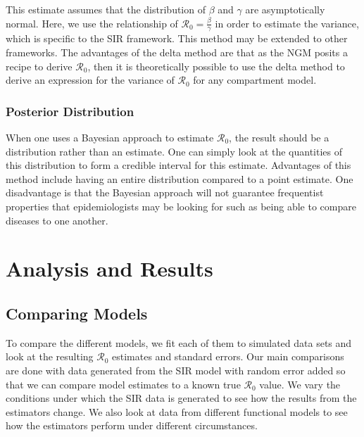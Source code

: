 \documentclass[12pt]{article}
\newcommand{\rr}{\ensuremath{\mathcal{R}_0}}
\begin{document}
This estimate assumes that the distribution of $\beta$ and $\gamma$ are asymptotically normal.  Here, we use the relationship of $\rr = \frac{\beta}{\gamma}$ in order to estimate the variance, which is specific to the SIR framework.  This method may be extended to other frameworks.  The advantages of the delta method are that as the NGM posits a recipe to derive $\rr$, then it is theoretically possible to use the delta method to derive an expression for the variance of $\rr$ for any compartment model.


\subsubsection{Posterior Distribution}
When one uses a Bayesian approach to estimate $\rr$, the result should be a distribution rather than an estimate.  One can simply look at the quantities of this distribution to form a credible interval for this estimate.  Advantages of this method include having an entire distribution compared to a point estimate.  One disadvantage is that the Bayesian approach will not guarantee frequentist properties that epidemiologists may be looking for such as being able to compare diseases to one another.







\section{Analysis and Results}
\label{sec:results}

\subsection{Comparing Models}

To compare the different models, we fit each of them to simulated data sets and look at the resulting $\rr$ estimates and standard errors. Our main comparisons are done with data generated from the SIR model with random error added so that we can compare model estimates to a known true $\rr$ value. We vary the conditions under which the SIR data is generated to see how the results from the estimators change. We also look at data from different functional models to see how the estimators perform under different circumstances.

\end{document}

